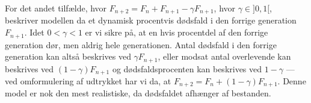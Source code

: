 \documentclass[11pt,a4paper]{article}
\begin{document}
For det andet tilfælde, hvor $F_{n+2} = F_n + F_{n+1} - \gamma F_{n+1}$,
hvor $\gamma \in ]0,1[$, beskriver modellen da et dynamisk procentvis
dødsfald i den forrige generation $F_{n+1}$. Idet $0 < \gamma < 1$ er vi
sikre på, at en hvis procentdel af den forrige generation dør, men aldrig
hele generationen. Antal dødsfald i den forrige generation kan altså
beskrives ved $\gamma F_{n+1}$, eller modsat antal overlevende kan beskrives
ved $(1 - \gamma) F_{n+1}$ og dødsfaldsprocenten kan beskrives ved $1 -
\gamma$ --- ved omformulering af udtrykket har vi da, at $F_{n+2} = F_n + (1
- \gamma) F_{n+1}$. Denne model er nok den mest realistiske, da dødsfaldet
afhænger af bestanden.
\end{document}
